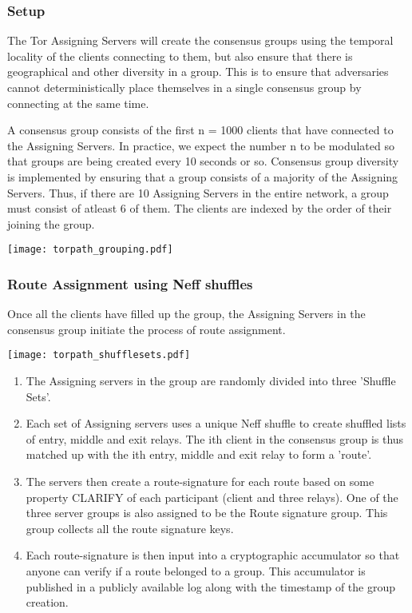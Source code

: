 \subsubsection{Setup}
The Tor Assigning Servers will create the consensus groups using the temporal locality of the clients connecting to them, but also ensure that there is geographical and other diversity in a group. This is to ensure that adversaries cannot deterministically place themselves in a single consensus group by connecting at the same time.

A consensus group consists of the first n = 1000 clients that have connected to the Assigning Servers. In practice, we expect the number n to be modulated so that groups are being created every 10 seconds or so. Consensus group diversity is implemented by ensuring that a group consists of a majority of the Assigning Servers. Thus, if there are 10 Assigning Servers in the entire network, a group must consist of atleast 6 of them. The clients are indexed by the order of their joining the group.

\texttt{[image: torpath\_grouping.pdf]}

\subsubsection{Route Assignment using Neff shuffles}
Once all the clients have filled up the group, the Assigning Servers in the consensus group initiate the process of route assignment.

\texttt{[image: torpath\_shufflesets.pdf]}

\begin{enumerate}
  \item The Assigning servers in the group are randomly divided into three 'Shuffle Sets'.
  \item Each set of Assigning servers uses a unique Neff shuffle to create shuffled lists of entry, middle and exit relays. The ith client in the consensus group is thus matched up with the ith entry, middle and exit relay to form a 'route'.
  \item The servers then create a route-signature for each route based on some property CLARIFY of each participant (client and three relays). One of the three server groups is also assigned to be the Route signature group. This group collects all the route signature keys.
  \item Each route-signature is then input into a cryptographic accumulator so that anyone can verify if a route belonged to a group. This accumulator is published in a publicly available log along with the timestamp of the group creation.
\end{enumerate}

